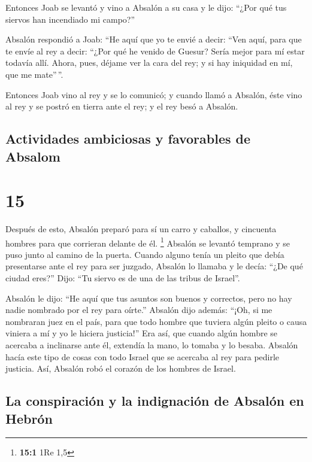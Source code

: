  Entonces Joab se levantó y vino a Absalón a su casa y le
dijo: ``¿Por qué tus siervos han incendiado mi campo?''

 Absalón respondió a Joab: ``He aquí que yo te envié a
decir: ``Ven aquí, para que te envíe al rey a decir: ``¿Por qué he
venido de Guesur? Sería mejor para mí estar todavía allí. Ahora, pues,
déjame ver la cara del rey; y si hay iniquidad en mí, que me mate''\,''.

 Entonces Joab vino al rey y se lo comunicó; y cuando
llamó a Absalón, éste vino al rey y se postró en tierra ante el rey; y
el rey besó a Absalón.

\hypertarget{actividades-ambiciosas-y-favorables-de-absalom}{%
\subsection{Actividades ambiciosas y favorables de
Absalom}\label{actividades-ambiciosas-y-favorables-de-absalom}}

\hypertarget{section-14}{%
\section{15}\label{section-14}}

 Después de esto, Absalón preparó para sí un carro y
caballos, y cincuenta hombres para que corrieran delante de él.
\footnote{\textbf{15:1} 1Re 1,5}  Absalón se levantó
temprano y se puso junto al camino de la puerta. Cuando alguno tenía un
pleito que debía presentarse ante el rey para ser juzgado, Absalón lo
llamaba y le decía: ``¿De qué ciudad eres?'' Dijo: ``Tu siervo es de una
de las tribus de Israel''.

 Absalón le dijo: ``He aquí que tus asuntos son buenos y
correctos, pero no hay nadie nombrado por el rey para oírte.''
 Absalón dijo además: ``¡Oh, si me nombraran juez en el
país, para que todo hombre que tuviera algún pleito o causa viniera a mí
y yo le hiciera justicia!''  Era así, que cuando algún
hombre se acercaba a inclinarse ante él, extendía la mano, lo tomaba y
lo besaba.  Absalón hacía este tipo de cosas con todo
Israel que se acercaba al rey para pedirle justicia. Así, Absalón robó
el corazón de los hombres de Israel.

\hypertarget{la-conspiraciuxf3n-y-la-indignaciuxf3n-de-absaluxf3n-en-hebruxf3n}{%
\subsection{La conspiración y la indignación de Absalón en
Hebrón}\label{la-conspiraciuxf3n-y-la-indignaciuxf3n-de-absaluxf3n-en-hebruxf3n}}

